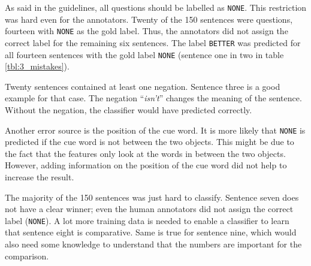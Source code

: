 As said in the guidelines, all questions should be labelled as \texttt{NONE}. This restriction was hard even for the annotators. Twenty of the 150 sentences were questions, fourteen with \texttt{NONE} as the gold label. Thus, the annotators did not assign the correct label for the remaining six sentences. The label \texttt{BETTER} was predicted for all fourteen sentences with the gold label \texttt{NONE} (sentence one in two in table  \ref{tbl:3_mistakes}).

Twenty sentences contained at least one negation. Sentence three  is a good example for that case. The negation \enquote{\emph{isn't}} changes the meaning of the sentence. Without the negation, the classifier would have predicted correctly.


Another error source is the position of the cue word. It is more likely that \texttt{NONE} is predicted if the cue word is not between the two objects. This might be due to the fact that the features only look at the words in between the two objects. However, adding information on the position of the cue word did not help to increase the result.

The majority of the 150 sentences was just hard to classify. Sentence seven does not have a clear winner; even the human annotators did not assign the correct label (\texttt{NONE}). A lot more training data is needed to enable a classifier to learn that sentence eight is comparative. Same is true for sentence nine, which would also need some knowledge to understand that the numbers are important for the comparison.\newline








